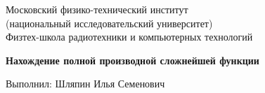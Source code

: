 \begin{titlepage}
    \begin{center}
        Московский физико-технический институт                  \\
        (национальный исследовательский университет)            \\
        Физтех-школа радиотехники и компьютерных технологий     \\

        \vspace{5cm}

        \large{\bf{Нахождение полной производной сложнейшей функции}}

        \vspace{10cm}
    \end{center}

    \begin{flushleft}
        Выполнил: Шляпин Илья Семенович
    \end{flushleft}

    \date{\today}
\end{titlepage}